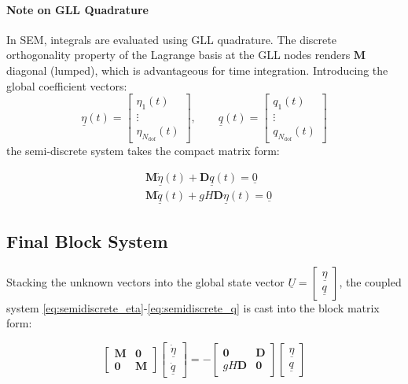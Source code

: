 \paragraph{Note on GLL Quadrature} In SEM, integrals are evaluated using GLL quadrature. The discrete orthogonality property of the Lagrange basis at the GLL nodes renders \(\mathbf{M}\) diagonal (lumped), which is advantageous for time integration. Introducing the global coefficient vectors:
\[
\underline{\eta}(t) =
\begin{bmatrix}
\eta_1(t) \\ \vdots \\ \eta_{N_{\mathrm{dof}}}(t)
\end{bmatrix},
\qquad
\underline{q}(t) =
\begin{bmatrix}
q_1(t) \\ \vdots \\ q_{N_{\mathrm{dof}}}(t)
\end{bmatrix}
\]
the semi-discrete system takes the compact matrix form:

\begin{align}
&\mathbf{M}\dot{\underline{\eta}}(t) + \mathbf{D}\underline{q}(t) = \underline{0} \label{eq:semidiscrete_eta} \\
&\mathbf{M}\dot{\underline{q}}(t) + gH\mathbf{D}\underline{\eta}(t) = \underline{0} \label{eq:semidiscrete_q}
\end{align}

\subsection{Final Block System}

Stacking the unknown vectors into the global state vector \(\underline{U} = \begin{bmatrix} \underline{\eta} \\ \underline{q} \end{bmatrix}\), the coupled system \eqref{eq:semidiscrete_eta}-\eqref{eq:semidiscrete_q} is cast into the block matrix form:

\begin{equation}
\begin{bmatrix} \mathbf{M} & \mathbf{0} \\ \mathbf{0} & \mathbf{M} \end{bmatrix}
\begin{bmatrix} \dot{\underline{\eta}} \\ \dot{\underline{q}} \end{bmatrix}
= - \begin{bmatrix} \mathbf{0} & \mathbf{D} \\ gH\mathbf{D} & \mathbf{0} \end{bmatrix}
\begin{bmatrix} \underline{\eta} \\ \underline{q} \end{bmatrix}
\label{eq:block_system_explicit}
\end{equation}

